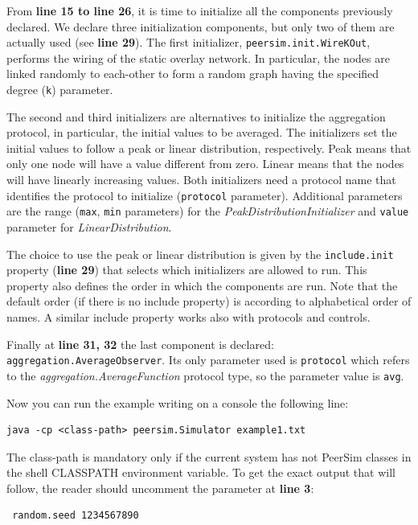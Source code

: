 \documentclass[a4paper,11pt]{article}
\begin{document}
From \textbf{line 15 to line 26}, it is time to initialize all the
components previously declared. We declare three initialization components,
but only two of them are actually used (see \textbf{line 29}).
The first initializer, \texttt{peersim.init.WireKOut},
performs the wiring of the static overlay network. 
In particular, the nodes are linked
randomly to each-other to form a random graph having the specified
degree (\texttt{k}) parameter. 

The second and third initializers are alternatives to initialize the aggregation
protocol, in particular, the initial values to be averaged.
The initializers set the initial values to follow a peak or linear
distribution, respectively.
Peak means that only one node will have a value different from zero.
Linear means that the nodes will have linearly increasing values.
Both initializers need a protocol name that identifies the
protocol to initialize (\texttt{protocol} parameter).
Additional parameters are the range (\texttt{max}, \texttt{min}
parameters)
for the \emph{PeakDistributionInitializer} and \texttt{value}
parameter for \emph{LinearDistribution}. 

The choice to use the peak or linear distribution is given by the
\texttt{include.init} property (\textbf{line 29}) that selects which
initializers are 
allowed to run.
This property also defines the order in which the components are run.
Note that the default order (if there is no include property) is according
to alphabetical order of names.
A similar include property works also with protocols and controls.

Finally at \textbf{line 31, 32} the last component is declared:
\texttt{aggregation.AverageObserver}.
Its only parameter used is \texttt{protocol} which refers to the
\emph{aggregation.AverageFunction} protocol type, so the parameter
value is \texttt{avg}.

Now you can run the example writing on a console the following line:

\begin{verbatim}
java -cp <class-path> peersim.Simulator example1.txt \end{verbatim}

The class-path is mandatory only if the current system has not PeerSim
classes in the shell CLASSPATH environment variable. To get the exact
output that will follow, the reader should uncomment the parameter
at \textbf{line 3}:

\begin{verbatim} random.seed 1234567890 \end{verbatim}
\end{document}
